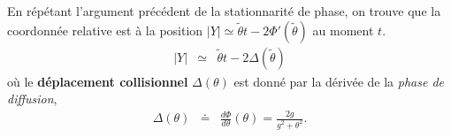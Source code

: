 En répétant l'argument précédent de la stationnarité de phase, on trouve que la coordonnée relative est à la position $\vert Y \vert  \simeq \tilde{\theta} t - 2\Phi'( \tilde{\theta})$ au moment $t$. %
\begin{eqnarray}
	\vert Y \vert & \simeq & 	\tilde{\theta} t  - 2 \Delta (\tilde{\theta} )
\end{eqnarray}
où le {\bf déplacement collisionnel} $\Delta (\theta)$ est donné par la dérivée de la {\em phase de diffusion},
\begin{eqnarray}\label{eq:I-1-16}
	\Delta ( \theta ) & \doteq & \frac{ d \Phi }{ d \theta } ( \theta )= \frac{ 2 g }{g^2 + \theta^2} . 	
\end{eqnarray}




